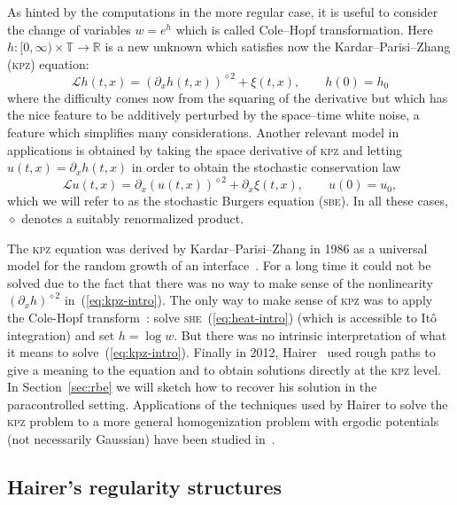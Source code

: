 \documentclass[a4paper,11pt]{article}
\newcommand{\tmname}[1]{\textsc{#1}}
\newcommand{\LL}{\mathscr{L}}
\newcommand{\renorm}{\,\mathord{\diamond}\,}
\begin{document}
As hinted by the computations in the more regular case, it is useful to
consider the change of variables $w = e^h$ which is called Cole--Hopf
transformation. Here $h : [0, \infty) \times \mathbb{T} \rightarrow
\mathbb{R}$ is a new unknown which satisfies now the Kardar--Parisi--Zhang
({\tmname{kpz}}) equation:
\begin{equation}
  \label{eq:kpz-intro} \LL h (t, x) = (\partial_x h (t, x))^{\renorm 2} + \xi
  (t, x), \hspace{2em} h (0) = h_0
\end{equation}
where the difficulty comes now from the squaring of the derivative but which
has the nice feature to be additively perturbed by the space--time white
noise, a feature which simplifies many considerations. Another relevant model
in applications is obtained by taking the space derivative of {\tmname{kpz}}
and letting $u (t, x) = \partial_x h (t, x)$ in order to obtain the stochastic
conservation law
\begin{equation}
  \label{eq:burgers-intro} \LL u (t, x) = \partial_x (u (t, x))^{\renorm 2} +
  \partial_x \xi (t, x), \hspace{2em} u (0) = u_0,
\end{equation}
which we will refer to as the stochastic Burgers equation ({\tmname{sbe}}). In
all these cases, $\renorm$ denotes a suitably renormalized product.

The {\tmname{kpz}} equation was derived by Kardar--Parisi--Zhang in 1986 as a
universal model for the random growth of an interface~{\cite{Kardar1986}}. For
a long time it could not be solved due to the fact that there was no way to
make sense of the nonlinearity $(\partial_x h)^{\renorm 2}$
in~(\ref{eq:kpz-intro}). The only way to make sense of {\tmname{kpz}} was to
apply the Cole-Hopf transform~{\cite{Bertini1997}}: solve
{\tmname{she}}~(\ref{eq:heat-intro}) (which is accessible to It{\^o}
integration) and set $h = \log w$. But there was no intrinsic interpretation
of what it means to solve~(\ref{eq:kpz-intro}). Finally in 2012,
Hairer~{\cite{Hairer2013b}} used rough paths to give a meaning to the equation
and to obtain solutions directly at the {\tmname{kpz}} level. In
Section~\ref{sec:rbe} we will sketch how to recover his solution in the
paracontrolled setting. Applications of the techniques used by Hairer to solve
the {\tmname{kpz}} problem to a more general homogenization problem with
ergodic potentials (not necessarily Gaussian) have been studied
in~{\cite{hairer_random_2013}}.

\subsection{Hairer's regularity structures}
\end{document}
